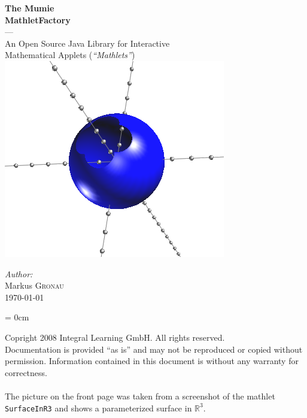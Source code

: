 \documentclass[a4paper,12pt]{article}
\newcommand{\codename}[1]{\texttt{\small #1}}
\begin{document}
\begin{titlepage}
\begin{center}

\vspace*{1.5cm}

\LARGE{\textbf{The Mumie}}\\
\huge{\textbf{MathletFactory}}\\[0.5cm]---\\[0.5cm]

\Large{An Open Source Java Library for Interactive \\Mathematical Applets (\textit{``Mathlets''})}\\[1.5cm]

\includegraphics[scale=0.9]{images/front.png}

\vspace*{1.5cm}

\emph{Author:}\\
Markus \textsc{Gronau}\\[0.3cm]
\today

\end{center}
\end{titlepage}

\newpage

\parindent = 0cm

\vspace*{3.0cm}

Copright 2008 Integral Learning GmbH. All rights reserved.\\
Documentation is provided ``as is'' and may not be reproduced or copied without permission.
Information contained in this document is without any warranty for correctness.\\
\\
The picture on the front page was taken from a screenshot of the mathlet \codename{SurfaceInR3} and shows
a parameterized surface in $\mathbb{R}^3$.
\end{document}
